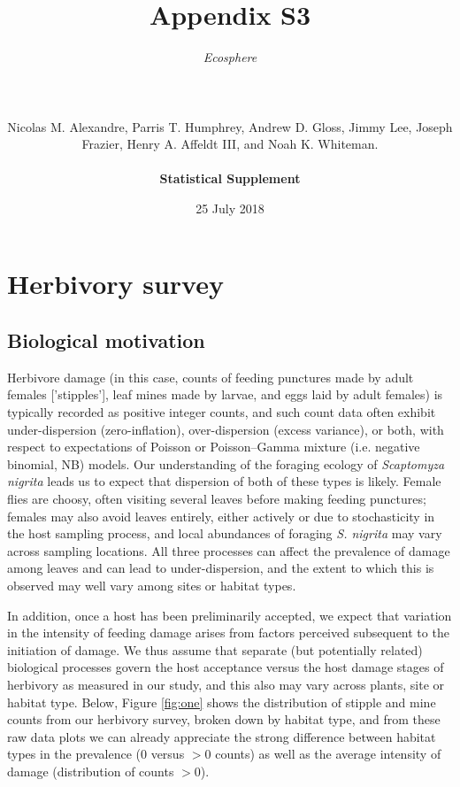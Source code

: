 \documentclass[11pt, oneside]{amsart}
\title{\textbf{Appendix S3}}
\author{\emph{Ecosphere}\\
\\
\text{Habitat preference of an herbivore shapes the habitat distribution of its host plant}
\\
\\
Nicolas M. Alexandre, Parris T. Humphrey, Andrew D. Gloss, Jimmy Lee, Joseph Frazier, Henry A. Affeldt III, and Noah K. Whiteman.\\
\\
\textbf{Statistical Supplement}}
\date{25 July 2018}
\begin{document}
 \maketitle
 
\tableofcontents

\section{Herbivory survey}
\subsection{Biological motivation}
\label{S:1}

Herbivore damage (in this case, counts of feeding punctures made by adult females ['stipples'], leaf mines made by larvae, and eggs laid by adult females) is typically recorded as positive integer counts, and such count data often exhibit under-dispersion (zero-inflation), over-dispersion (excess variance), or both, with respect to expectations of Poisson or Poisson--Gamma mixture (i.e. negative binomial, NB) models. Our understanding of the foraging ecology of \emph{Scaptomyza nigrita} leads us to expect that dispersion of both of these types is likely. Female flies are choosy, often visiting several leaves before making feeding punctures; females may also avoid leaves entirely, either actively or due to stochasticity in the host sampling process, and local abundances of foraging \emph{S. nigrita} may vary across sampling locations. All three processes can affect the prevalence of damage among leaves and can lead to under-dispersion, and the extent to which this is observed may well vary among sites or habitat types.

In addition, once a host has been preliminarily accepted, we expect that variation in the intensity of feeding damage arises from factors perceived subsequent to the initiation of damage. We thus assume that separate (but potentially related) biological processes govern the host acceptance versus the host damage stages of herbivory as measured in our study, and this also may vary across plants, site or habitat type. Below, Figure \ref{fig:one} shows the distribution of stipple and mine counts from our herbivory survey, broken down by habitat type, and from these raw data plots we can already appreciate the strong difference between habitat types in the prevalence (0 versus $>0$ counts) as well as the average intensity of damage (distribution of counts $>0$).
\end{document}
